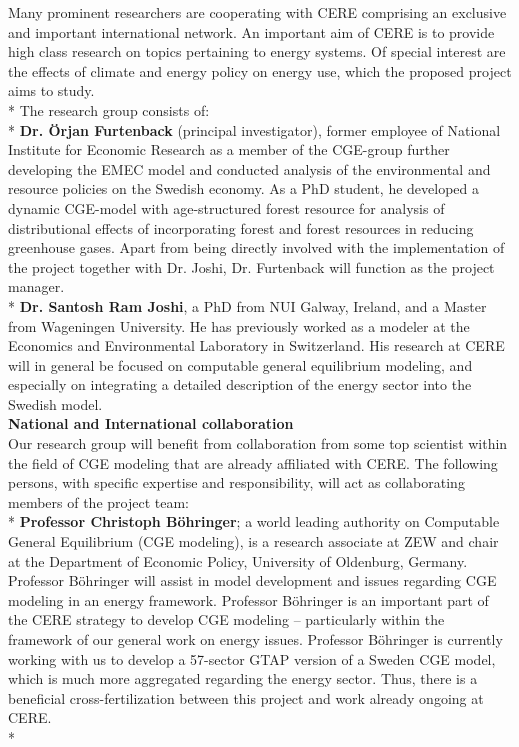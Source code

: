 Many prominent researchers are cooperating with CERE comprising an exclusive and important international network. An important aim of CERE is to provide high class research on topics pertaining to energy systems. Of special interest are the effects of climate and energy policy on energy use, which the proposed project aims to study.\\*
The research group consists of:\\*
\textbf{Dr. Örjan Furtenback} (principal investigator), former employee of National Institute for Economic Research as a member of the CGE-group further developing the EMEC model and conducted analysis of the environmental and resource policies on the Swedish economy. As a PhD student, he developed a dynamic CGE-model with age-structured forest resource for analysis of distributional effects of incorporating forest and forest resources in reducing greenhouse gases. Apart from being directly involved with the implementation of the project together with Dr. Joshi, Dr. Furtenback will function as the project manager.\\*
\textbf{Dr. Santosh Ram Joshi}, a PhD from NUI Galway, Ireland, and a Master from Wageningen University. He has previously worked as a modeler at the Economics and Environmental Laboratory in Switzerland. His research at CERE will in general be focused on computable general equilibrium modeling, and especially on integrating a detailed description of the energy sector into the Swedish model.\\
\textbf{National and International collaboration}\\
Our research group will benefit from collaboration from some top scientist within the field of CGE modeling that are already affiliated with CERE. The following persons, with specific expertise and responsibility, will act as collaborating members of the project team:\\*
\textbf{Professor Christoph Böhringer}; a world leading authority on Computable General Equilibrium (CGE modeling), is a research associate at ZEW and chair at the Department of Economic Policy, University of Oldenburg, Germany. Professor Böhringer will assist in model development and issues regarding CGE modeling in an energy framework. Professor Böhringer is an important part of the CERE strategy to develop CGE modeling – particularly within the framework of our general work on energy issues. Professor Böhringer is currently working with us to develop a 57-sector GTAP version of a Sweden CGE model, which is much more aggregated regarding the energy sector. Thus, there is a beneficial cross-fertilization between this project and work already ongoing at CERE.\\*
